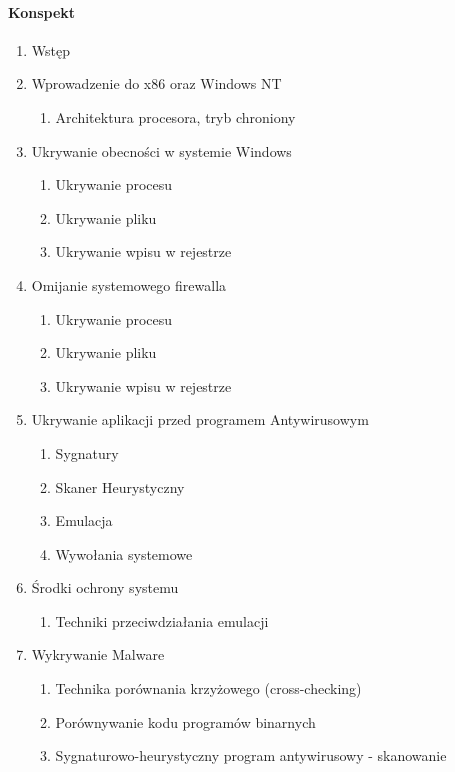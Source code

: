 \paragraph{Konspekt}



\begin{enumerate}
  \item Wstęp

  \item Wprowadzenie do x86 oraz Windows NT 
  	\begin{enumerate}
    	\item Architektura procesora, tryb chroniony
  	\end{enumerate}

  \item Ukrywanie obecności w systemie Windows 
    \begin{enumerate}
	\item Ukrywanie procesu
    \item Ukrywanie pliku
    \item Ukrywanie wpisu w rejestrze
    \end{enumerate}

  \item Omijanie systemowego firewalla
    \begin{enumerate}
	\item Ukrywanie procesu
    \item Ukrywanie pliku
    \item Ukrywanie wpisu w rejestrze
    \end{enumerate}


  \item Ukrywanie aplikacji przed programem Antywirusowym
    \begin{enumerate}
	\item Sygnatury
    \item Skaner Heurystyczny
    \item Emulacja
    \item Wywołania systemowe
    \end{enumerate}

  \item Środki ochrony systemu
    \begin{enumerate}
	\item Techniki przeciwdziałania emulacji
    \end{enumerate}
    
  \item Wykrywanie Malware
    \begin{enumerate}
	\item Technika porównania krzyżowego (cross-checking)
	\item Porównywanie kodu programów binarnych
	\item Sygnaturowo-heurystyczny program antywirusowy - skanowanie
    \end{enumerate}
    

\end{enumerate}
